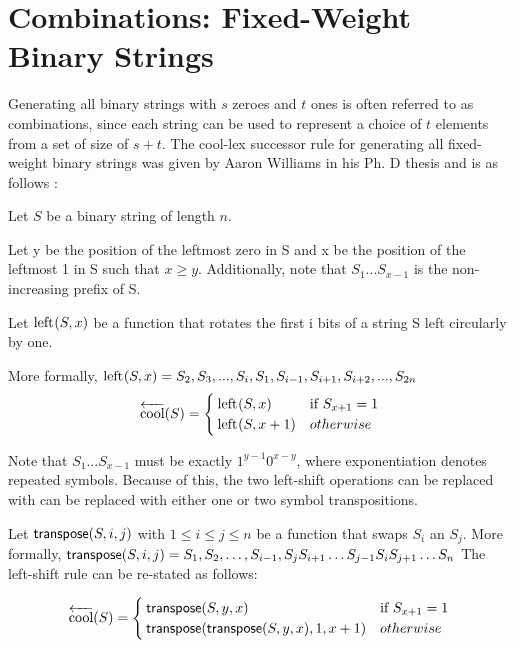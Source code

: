 \section{Combinations: Fixed-Weight Binary Strings}
Generating all binary strings with $s$ zeroes and $t$ ones is often referred to as combinations, since each string can be used to represent a choice of $t$ elements from a set of size of $s+t$.  The cool-lex successor rule for generating all fixed-weight binary strings was given by Aaron Williams in his Ph. D thesis and is as follows \cite{williams2009shift}:

\noindent Let $S$ be a binary string of length $n$.

\noindent Let y be the position of the leftmost zero in S and x be the position of the leftmost 1 in S such that $x \ge y$.  Additionally, note that $S_1...S_{x-1}$ is the non-increasing prefix of S.

Let $\operatorname{left}_{}(S,x)$ be a function that rotates the first i bits of a string S left circularly by one.

More formally, 
\noindent $\operatorname{left}_{}(S,x)=S_2,S_3,...,S_i,S_1,S_{i-1},S_{i+1},S_{i+2},...,S_{2n}$
\begin{equation*}
    \overleftarrow{\text{cool}}(S) = \begin{cases}
	\operatorname{left}_{}(S,x) & \text{if $S_{x+1}=1$}\\
	\operatorname{left}_{}(S,x+1) & otherwise\\
\end{cases}
\end{equation*}

Note that $S_1...S_{x-1}$ must be exactly $1^{y-1}0^{x-y}$, where exponentiation denotes repeated symbols.  Because of this, the two left-shift operations can be replaced with can be replaced with either one or two symbol transpositions.  

\noindent Let $\mathsf{transpose(} S, i, j \mathsf{)}$ with $1 \le i \le j \le n$ be a function that swaps $S_i$ an $S_j$.  More formally, $\mathsf{transpose(} S, i, j \mathsf{)}=S_1,S_2,\dots,S_{i-1},S_{j}S_{i+1}\dots S_{j-1}S_i S_{j+1}\dots S_n$
The left-shift rule can be re-stated as follows:

\begin{equation*}
    \overleftarrow{\text{cool}}(S) = \begin{cases}
	\mathsf{transpose(} S, y, x \mathsf{)} & \text{if $S_{x+1}=1$}\\
	\mathsf{transpose(} \mathsf{transpose(} S, y, x \mathsf{)}, 1, x+1 \mathsf{)} & otherwise\\
\end{cases}
\end{equation*}

